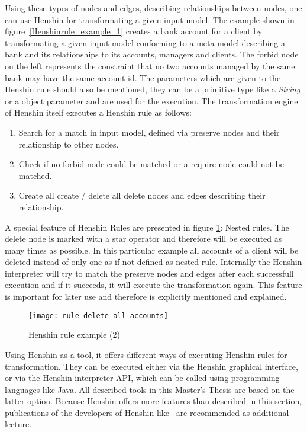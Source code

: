Using these types of nodes and edges, describing relationships between
nodes, one can use Henshin for transformating a given input model.
The example shown in figure~\ref{Henshinrule_example_1} creates a bank account
for a client by transformating a given input model conforming to a meta model
describing a bank and its relationships to its accounts, managers and clients.
The forbid node on the left represents the constraint that no two accounts managed by the same bank may
have the same account id. The parameters which are given to the Henshin rule
should also be mentioned, they can be a primitive type like a \textit{String} or
a object parameter and are used for the execution. The transformation engine of
Henshin itself executes a Henshin rule as follows:
\begin{enumerate}
  \item Search for a match in input model, defined via preserve nodes and their
  relationship to other nodes.
  \item Check if no forbid node could be matched or a require node could not be
  matched.
  \item Create all create / delete all delete nodes and edges describing their
  relationship.
\end{enumerate}
A special feature of Henshin Rules are presented in figure
\ref{Henshinrule_example_2}: Nested rules. The delete node is marked with a
star operator and therefore will be executed as many times as possible. In this
particular example all accounts of a client will be deleted instead of only
one as if not defined as nested rule. Internally the Henshin interpreter will
try to match the preserve nodes and edges after each successfull execution and
if it succeeds, it will execute the transformation again. This feature is important
for later use and therefore is explicitly mentioned and explained.
\newpage
\begin{figure}[h!]
\begin{center}
\texttt{[image: rule-delete-all-accounts]}\\
\end{center}
\caption{Henshin rule example (2)~\cite{Henshin}}
\label{Henshinrule_example_2}
\end{figure}

Using Henshin as a tool, it offers different ways of executing Henshin
rules for transformation. They can be executed either via the Henshin
graphical interface, or via the Henshin interpreter \ac{API}, which can be
called using programming languages like Java. All described tools in this
Master's Thesis are based on the latter option. Because Henshin offers more
features than described in this section, publications of the developers of
Henshin like~\cite{henshinpublication} are recommended as additional lecture.
